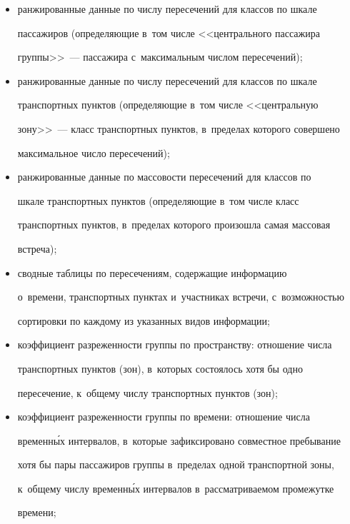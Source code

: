      \begin{itemize}


\item ранжированные данные по числу пересечений для классов по шкале 


пассажиров (определяющие в~том числе <<центрального пассажира 


группы>>~--- пассажира с~максимальным числом пересечений);


\item ранжированные данные по числу пересечений для классов по шкале 


транспортных пунктов (определяющие в~том числе <<центральную 


зону>>~--- класс транспортных пунктов, в~пределах которого совершено 


максимальное число пересечений);


\item ранжированные данные по массовости пересечений для классов по 


шкале транспортных пунктов (определяющие в~том числе класс 


транспортных пунктов, в~пределах которого произошла самая массовая 


встреча);


\item сводные таблицы по пересечениям, содержащие информацию 


о~времени, транспортных пунктах и~участниках встречи, с~возможностью 


сортировки по каждому из указанных видов информации;


\item коэффициент разреженности группы по пространству: отношение числа 


транспортных пунктов (зон), в~которых состоялось хотя бы одно 


пересечение, к~общему числу транспортных пунктов (зон);\\[-13.5pt]


\item коэффициент разреженности группы по времени: отношение числа 


временн\'{ы}х интервалов, в~которые зафиксировано совместное пребывание 


хотя бы пары пассажиров группы в~пределах одной транспортной зоны, 


к~общему числу временн\'{ы}х интервалов в~рассматриваемом промежутке 


времени;\\[-13.5pt]



\end{itemize}
